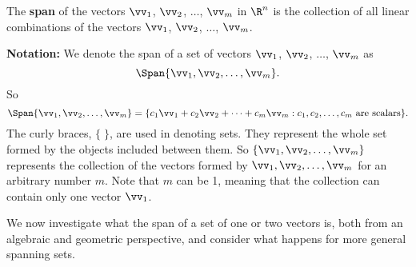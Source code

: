 \begin{definition} \label{def:1_d_span}  The \textbf{span} of the vectors $\vv_1$, $\vv_2$, $\ldots$, $\vv_m$ in $\R^n$ is the collection of all  linear combinations of the vectors $\vv_1$, $\vv_2$, $\ldots$, $\vv_m$.
\end{definition}



\noindent \textbf{Notation:} We denote the span of a set of vectors $\vv_1$, $\vv_2$, $\ldots$, $\vv_m$ as
\[\Span \{\vv_1, \vv_2, \ldots, \vv_m\} .\]
So
\[\Span \{\vv_1, \vv_2, \ldots, \vv_m\}  = \{c_1\vv_1+c_2\vv_2 + \cdots + c_m \vv_m : c_1, c_2, \ldots, c_m \text{ are scalars}\}.\]
The curly braces, $\{ \; \}$, are used in denoting sets. They represent the whole set formed by the objects included between them. So $\{\vv_1, \vv_2, \ldots, \vv_m\}$ represents the collection of the vectors formed by $\vv_1, \vv_2, \ldots, \vv_m$ for an arbitrary number $m$. Note that $m$ can be 1, meaning that the collection can contain only one vector $\vv_1$.



We now investigate what the span of a set of one or two vectors is, both from an algebraic and geometric perspective, and consider what happens for more general spanning sets.

